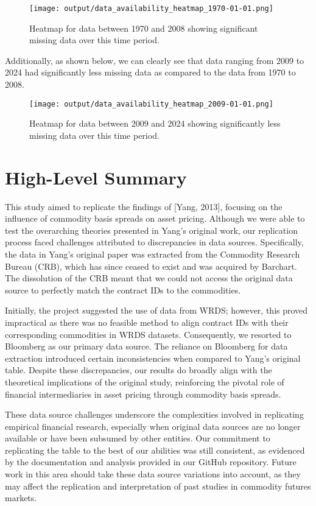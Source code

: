 \documentclass{article}
\begin{document}
\begin{figure}[h]
  \centering
  \texttt{[image: output/data\_availability\_heatmap\_1970-01-01.png]}
  \caption{Heatmap for data between 1970 and 2008 showing significant missing data over this time period.}
  \label{fig:my_graph}
\end{figure}

Additionally, as shown below, we can clearly see that data ranging from 2009 to 2024 had significantly less missing data as compared to the data from 1970 to 2008.

\begin{figure}[h]
  \centering
  \texttt{[image: output/data\_availability\_heatmap\_2009-01-01.png]}
  \caption{Heatmap for data between 2009 and 2024 showing significantly less missing data over this time period.}
  \label{fig:my_graph}
\end{figure}

\section{High-Level Summary}

This study aimed to replicate the findings of [Yang, 2013], focusing on the influence of commodity basis spreads on asset pricing. Although we were able to test the overarching theories presented in Yang’s original work, our replication process faced challenges attributed to discrepancies in data sources. Specifically, the data in Yang's original paper was extracted from the Commodity Research Bureau (CRB), which has since ceased to exist and was acquired by Barchart. The dissolution of the CRB meant that we could not access the original data source to perfectly match the contract IDs to the commodities.

Initially, the project suggested the use of data from WRDS; however, this proved impractical as there was no feasible method to align contract IDs with their corresponding commodities in WRDS datasets. Consequently, we resorted to Bloomberg as our primary data source. The reliance on Bloomberg for data extraction introduced certain inconsistencies when compared to Yang’s original table. Despite these discrepancies, our results do broadly align with the theoretical implications of the original study, reinforcing the pivotal role of financial intermediaries in asset pricing through commodity basis spreads.

These data source challenges underscore the complexities involved in replicating empirical financial research, especially when original data sources are no longer available or have been subsumed by other entities. Our commitment to replicating the table to the best of our abilities was still consistent, as evidenced by the documentation and analysis provided in our GitHub repository. Future work in this area should take these data source variations into account, as they may affect the replication and interpretation of past studies in commodity futures markets.
\end{document}
